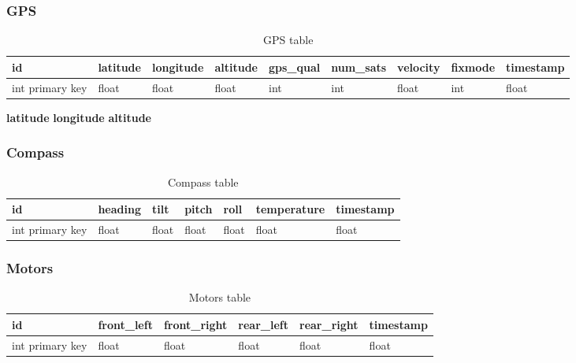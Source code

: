 \subsubsection{GPS}

\begin{table}[!htb]
\centering
\caption{GPS table}
\label{my-label}
\begin{tabular}{@{}lllllllll@{}}
\toprule
id              & latitude & longitude & altitude & gps\_qual & num\_sats & velocity & fixmode & timestamp \\ \midrule
int primary key & float    & float     & float    & int       & int       & float    & int     & float    
\end{tabular}
\end{table}
\textbf{latitude}
\newline
\textbf{longitude} 
\newline
\textbf{altitude} 
\newline

\subsubsection{Compass}
\begin{table}[!htb]
\centering
\caption{Compass table}
\label{my-label}
\begin{tabular}{@{}lllllll@{}}
\toprule
id              & heading & tilt  & pitch & roll  & temperature & timestamp \\ \midrule
int primary key & float   & float & float & float & float       & float    
\end{tabular}
\end{table}

\subsubsection{Motors}
\begin{table}[!htb]
\centering
\caption{Motors table}
\label{my-label}
\begin{tabular}{@{}llllll@{}}
\toprule
id              & front\_left & front\_right & rear\_left & rear\_right & timestamp \\ \midrule
int primary key & float       & float        & float      & float       & float    
\end{tabular}
\end{table}

